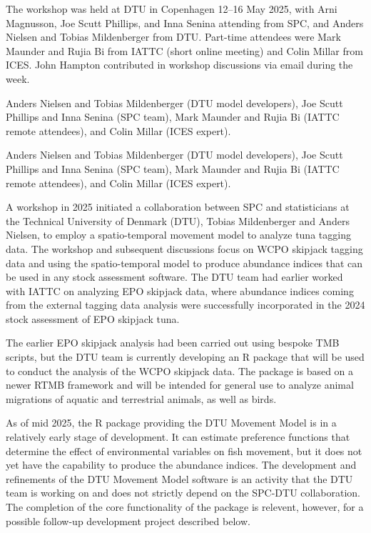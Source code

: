 \documentclass{SCreport}
\begin{document}
The workshop was held at DTU in Copenhagen 12--16 May 2025, with Arni Magnusson,
Joe Scutt Phillips, and Inna Senina attending from SPC, and Anders Nielsen and
Tobias Mildenberger from DTU. Part-time attendees were Mark Maunder and Rujia Bi
from IATTC (short online meeting) and Colin Millar from ICES. John Hampton
contributed in workshop discussions via email during the week.

Anders Nielsen and Tobias Mildenberger (DTU model
developers), Joe Scutt Phillips and Inna Senina (SPC team),
Mark Maunder and Rujia Bi (IATTC remote attendees),
and Colin Millar (ICES expert).

Anders Nielsen and Tobias Mildenberger (DTU model
developers), Joe Scutt Phillips and Inna Senina (SPC team),
Mark Maunder and Rujia Bi (IATTC remote attendees),
and Colin Millar (ICES expert).

A workshop in 2025 initiated a collaboration between SPC and statisticians at
the Technical University of Denmark (DTU), Tobias Mildenberger and Anders
Nielsen, to employ a spatio-temporal movement model to analyze tuna tagging
data. The workshop and subsequent discussions focus on WCPO skipjack tagging
data and using the spatio-temporal model to produce abundance indices that can
be used in any stock assessment software. The DTU team had earlier worked with
IATTC on analyzing EPO skipjack data, where abundance indices coming from the
external tagging data analysis were successfully incorporated in the 2024 stock
assessment of EPO skipjack tuna.

The earlier EPO skipjack analysis had been carried out using bespoke TMB
scripts, but the DTU team is currently developing an R package that will be used
to conduct the analysis of the WCPO skipjack data. The package is based on a
newer RTMB framework and will be intended for general use to analyze animal
migrations of aquatic and terrestrial animals, as well as birds.

As of mid 2025, the R package providing the DTU Movement Model is in a
relatively early stage of development. It can estimate preference functions that
determine the effect of environmental variables on fish movement, but it does
not yet have the capability to produce the abundance indices. The development
and refinements of the DTU Movement Model software is an activity that the DTU
team is working on and does not strictly depend on the SPC-DTU collaboration.
The completion of the core functionality of the package is relevent, however,
for a possible follow-up development project described below.
\end{document}
